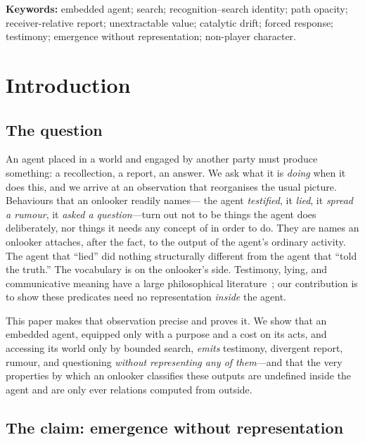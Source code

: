 \documentclass[11pt,twocolumn,a4paper]{article}
\begin{document}
\vspace{0.5em}
\noindent\textbf{Keywords:} embedded agent; search; recognition--search
identity; path opacity; receiver-relative report; unextractable value;
catalytic drift; forced response; testimony; emergence without
representation; non-player character.

\section{Introduction}
\label{sec:intro}

\subsection{The question}

An agent placed in a world and engaged by another party must produce
something: a recollection, a report, an answer. We ask what it is
\emph{doing} when it does this, and we arrive at an observation that
reorganises the usual picture. Behaviours that an onlooker readily names---
the agent \emph{testified}, it \emph{lied}, it \emph{spread a rumour}, it
\emph{asked a question}---turn out not to be things the agent does
deliberately, nor things it needs any concept of in order to do. They are
names an onlooker attaches, after the fact, to the output of the agent's
ordinary activity. The agent that ``lied'' did nothing structurally
different from the agent that ``told the truth.'' The vocabulary is on the
onlooker's side. Testimony, lying, and communicative meaning have a large
philosophical literature~\cite{coady1992,mahon2016,grice1975,%
sperberwilson1986,davidson1973}; our contribution is to show these
predicates need no representation \emph{inside} the agent.

This paper makes that observation precise and proves it. We show that an
embedded agent, equipped only with a purpose and a cost on its acts, and
accessing its world only by bounded search, \emph{emits} testimony,
divergent report, rumour, and questioning \emph{without representing any of
them}---and that the very properties by which an onlooker classifies these
outputs are undefined inside the agent and are only ever relations computed
from outside.

\subsection{The claim: emergence without representation}
\end{document}
